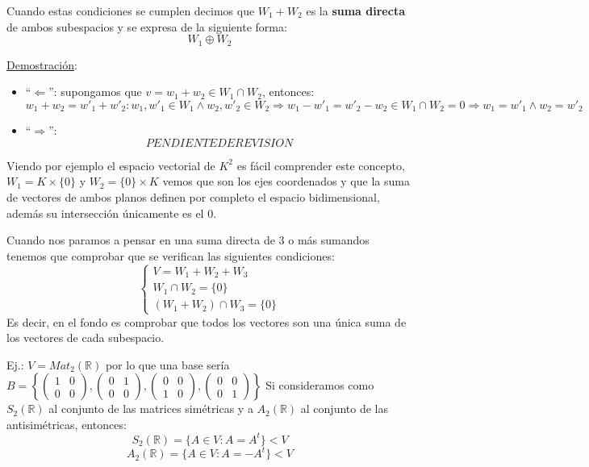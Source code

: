\documentclass[10pt,a4paper,openright]{book}
\begin{document}
Cuando estas condiciones se cumplen decimos que $W_1+W_2$ es la \textbf{suma directa} de ambos subespacios y se expresa de la siguiente forma:
$$W_1\oplus W_2$$

\underline{Demostración}:
\begin{itemize}
\item ``$\Leftarrow$'': supongamos que $v=w_1+w_2\in W_1\cap W_2$, entonces:
$$w_1+w_2=w'_1+w'_2: w_1,w'_1\in W_1\wedge w_2,w'_2\in W_2\Rightarrow w_1-w'_1=w'_2-w_2\in W_1\cap W_2=0\Rightarrow w_1=w'_1 \wedge w_2=w'_2$$

\item ``$\Rightarrow$'':
$$PENDIENTE DE REVISION$$
\end{itemize}

Viendo por ejemplo el espacio vectorial de $K^2$ es fácil comprender este concepto, $W_1=K\times \{0\}$ y $W_2=\{0\}\times K$ vemos que son los ejes coordenados y que la suma de vectores de ambos planos definen por completo el espacio bidimensional, además su intersección únicamente es el 0.\par

Cuando nos paramos a pensar en una suma directa de 3 o más sumandos tenemos que comprobar que se verifican las siguientes condiciones:
$$\begin{cases}V=W_1+W_2+W_3 \\
W_1\cap W_2=\{0\}\\
(W_1+W_2)\cap W_3=\{0\}\end{cases}$$
Es decir, en el fondo es comprobar que todos los vectores son  una única suma de los vectores de cada subespacio.

Ej.: $V=Mat_2(\mathbb R)$ por lo que una base sería $B=\left\lbrace
\left(\begin{array}{cc}1&0\\ 0&0\end{array}\right),\left(\begin{array}{cc}0&1\\ 0&0\end{array}\right),
\left(\begin{array}{cc}0&0\\ 1&0\end{array}\right),
\left(\begin{array}{cc}0&0\\ 0&1\end{array}\right)
\right\rbrace$
Si consideramos como $S_2(\mathbb{R})$ al conjunto de las matrices simétricas y a $A_2(\mathbb R)$ al conjunto de las antisimétricas, entonces:
$$S_2(\mathbb R)=\{A\in V: A=A^t\}<V$$
$$A_2(\mathbb R)=\{A\in V: A=-A^t\}<V$$
\end{document}
